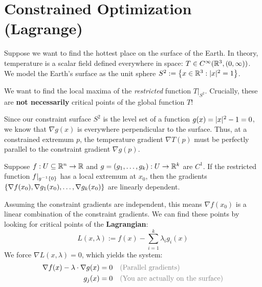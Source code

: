 \hrulefill

\section{Constrained Optimization (Lagrange)}

Suppose we want to find the hottest place on the surface of the Earth. 
In theory, temperature is a scalar field defined everywhere in space: $T \in C^\infty(\mathbb{R}^3, (0, \infty))$. We model the Earth's surface as the unit sphere $S^2 := \left\{ x \in \mathbb{R}^3 : \lvert x\rvert^2 = 1 \right\}$.

We want to find the local maxima of the \emph{restricted} function $T|_{S^2}$. 
Crucially, these are \textbf{not necessarily} critical points of the global function $T$! 


Since our constraint surface $S^2$ is the level set of a function $g(x) = \lvert x\rvert^2 - 1 = 0$, we know that $\nabla g(x)$ is everywhere perpendicular to the surface. 
Thus, at a constrained extremum $p$, the temperature gradient $\nabla T(p)$ must be perfectly parallel to the constraint gradient $\nabla g(p)$.

\begin{proposition*}
Suppose $f: U \subseteq \mathbb{R}^n \to \mathbb{R}$ and $g = (g_1, \dots, g_k): U \to \mathbb{R}^k$ are $C^1$. 
If the restricted function $f|_{g^{-1}\left\{ 0 \right\}}$ has a local extremum at $x_0$, then the gradients $\left\{ \nabla f(x_0), \nabla g_1(x_0), \dots, \nabla g_k(x_0) \right\}$ are linearly dependent.

Assuming the constraint gradients are independent, this means $\nabla f(x_0)$ is a linear combination of the constraint gradients. We can find these points by looking for critical points of the \textbf{Lagrangian}:
\[ L(x, \lambda) := f(x) - \sum_{i=1}^k \lambda_i g_i(x) \]
We force $\nabla L(x, \lambda) = 0$, which yields the system:
\begin{equation}
    \begin{aligned}
        \nabla f(x) - \lambda \cdot \nabla g(x) &= 0 \quad \text{\textcolor{eGray}{(Parallel gradients)}} \\
        g_j(x) &= 0 \quad \text{\textcolor{eGray}{(You are actually on the surface)}}
    \end{aligned}
\end{equation}
\end{proposition*}

